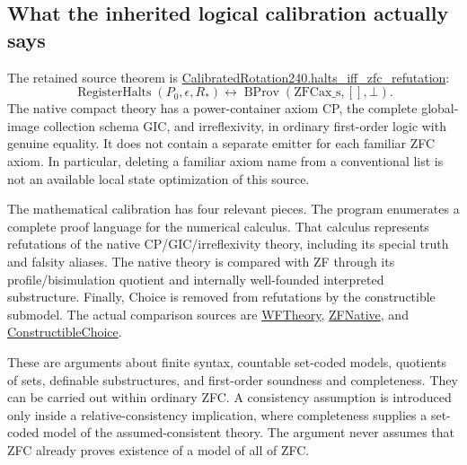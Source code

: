 \subsection{What the inherited logical calibration actually says}

The retained source theorem is
\href{https://github.com/VladimirReshetnikov/ProveIt/blob/ce192939372ac7944fe2a0208c68a96d49fb5e3b/Computability/BusyBeaver/Lean/BusyBeaver/ZFC/CalibratedRotation240.lean}
{CalibratedRotation240.halts\_iff\_zfc\_refutation}:
\[
 \operatorname{RegisterHalts}(P_0,\epsilon,R_*)
 \longleftrightarrow
 \operatorname{BProv}(\mathrm{ZFCax\_s},[],\bot).
\]
The native compact theory has a power-container axiom CP, the complete
global-image collection schema GIC, and irreflexivity, in ordinary
first-order logic with genuine equality.  It does not contain a separate
emitter for each familiar ZFC axiom.  In particular, deleting a familiar
axiom name from a conventional list is not an available local state
optimization of this source.

The mathematical calibration has four relevant pieces.  The program
enumerates a complete proof language for the numerical calculus.  That
calculus represents refutations of the native CP/GIC/irreflexivity theory,
including its special truth and falsity aliases.  The native theory is
compared with ZF through its profile/bisimulation quotient and internally
well-founded interpreted substructure.  Finally, Choice is removed from
refutations by the constructible submodel.  The actual comparison sources
are
\href{https://github.com/VladimirReshetnikov/ProveIt/blob/ce192939372ac7944fe2a0208c68a96d49fb5e3b/Computability/BusyBeaver/Lean/BusyBeaver/ZFC/WFTheory.lean}
{WFTheory},
\href{https://github.com/VladimirReshetnikov/ProveIt/blob/ce192939372ac7944fe2a0208c68a96d49fb5e3b/Computability/BusyBeaver/Lean/BusyBeaver/ZFC/ZFNative.lean}
{ZFNative}, and
\href{https://github.com/VladimirReshetnikov/ProveIt/blob/ce192939372ac7944fe2a0208c68a96d49fb5e3b/Computability/BusyBeaver/Lean/BusyBeaver/ZFC/ConstructibleChoice.lean}
{ConstructibleChoice}.

These are arguments about finite syntax, countable set-coded models,
quotients of sets, definable substructures, and first-order soundness and
completeness.  They can be carried out within ordinary ZFC.  A consistency
assumption is introduced only inside a relative-consistency implication,
where completeness supplies a set-coded model of the assumed-consistent
theory.  The argument never assumes that ZFC already proves existence of
a model of all of ZFC.

